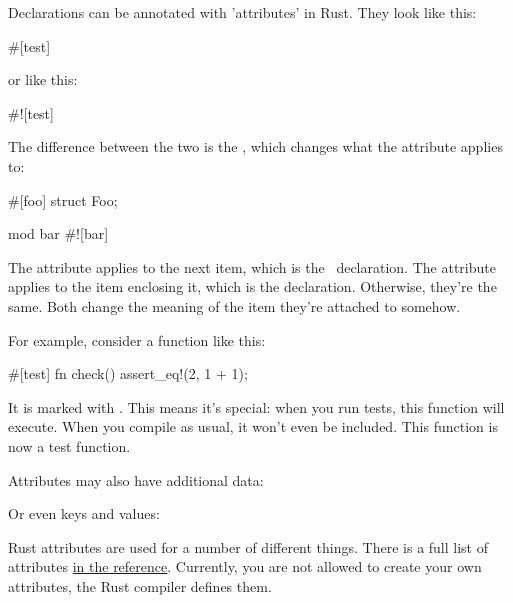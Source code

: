 Declarations can be annotated with 'attributes' in Rust. They look like this:

\begin{rustc}
#[test]
\end{rustc}

or like this:

\begin{rustc}
#![test]
\end{rustc}

The difference between the two is the \code{!}, which changes what the attribute applies to:

\begin{rustc}
#[foo]
struct Foo;

mod bar {
    #![bar]
}
\end{rustc}

The \code{\#[foo]} attribute applies to the next item, which is the \struct\ declaration. The \code{\#![bar]} attribute applies to the 
item enclosing it, which is the  declaration. Otherwise, they're the same. Both change the meaning of the item they're 
attached to somehow.

\blank

For example, consider a function like this:

\begin{rustc}
#[test]
fn check() {
    assert_eq!(2, 1 + 1);
}
\end{rustc}

It is marked with \code{\#[test]}. This means it's special: when you run tests, this function will execute. When you compile as usual, 
it won't even be included. This function is now a test function.

\blank

Attributes may also have additional data:

\begin{rustc}
#[inline(always)]
fn super_fast_fn() {
\end{rustc}

Or even keys and values:

\begin{rustc}
#[cfg(target_os = "macos")]
mod macos_only {
\end{rustc}

Rust attributes are used for a number of different things. There is a full list of attributes 
\href{https://doc.rust-lang.org/reference.html#attributes}{in the reference}. Currently, you are not allowed to create your own 
attributes, the Rust compiler defines them.
